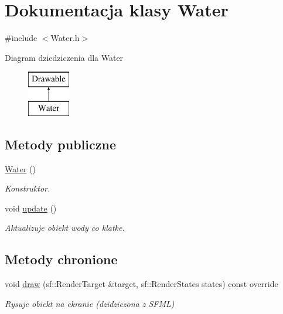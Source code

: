 \hypertarget{class_water}{}\section{Dokumentacja klasy Water}
\label{class_water}


{\ttfamily \#include $<$Water.\+h$>$}

Diagram dziedziczenia dla Water\begin{figure}[H]
\begin{center}
\leavevmode
\includegraphics[height=2.000000cm]{class_water}
\end{center}
\end{figure}
\subsection*{Metody publiczne}
\begin{DoxyCompactItemize}
\item 
\mbox{\hyperlink{class_water_a32d8f391b149a405008a606ceafa35ee}{Water}} ()
\begin{DoxyCompactList}\small\item\em Konstruktor. \end{DoxyCompactList}\item 
void \mbox{\hyperlink{class_water_a18fce2c0b2c45ee4ea8e413fcb4bdafa}{update}} ()
\begin{DoxyCompactList}\small\item\em Aktualizuje obiekt wody co klatke. \end{DoxyCompactList}\end{DoxyCompactItemize}
\subsection*{Metody chronione}
\begin{DoxyCompactItemize}
\item 
void \mbox{\hyperlink{class_water_a4a929b9c339c55d6c7bcabe79349bae8}{draw}} (sf\+::\+Render\+Target \&target, sf\+::\+Render\+States states) const override
\begin{DoxyCompactList}\small\item\em Rysuje obiekt na ekranie (dzidziczona z S\+F\+ML) \end{DoxyCompactList}\end{DoxyCompactItemize}


